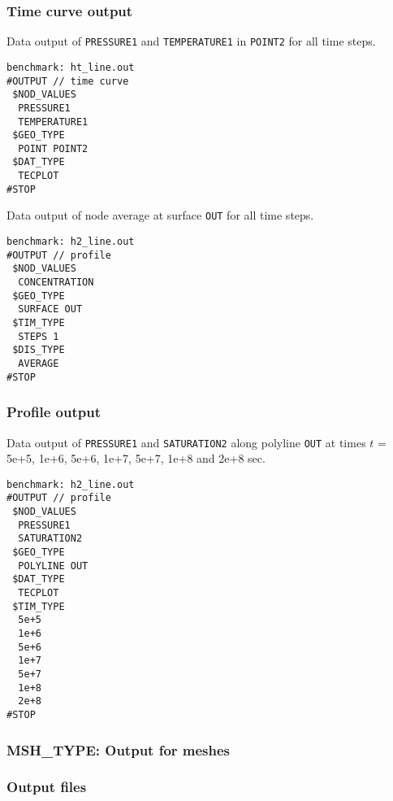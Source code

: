 {%
\subsubsection{Time curve output}

Data output of \texttt{PRESSURE1} and \texttt{TEMPERATURE1} in
\texttt{POINT2} for all time steps.

\begin{verbatim}
benchmark: ht_line.out
#OUTPUT // time curve
 $NOD_VALUES
  PRESSURE1
  TEMPERATURE1
 $GEO_TYPE
  POINT POINT2
 $DAT_TYPE
  TECPLOT
#STOP
\end{verbatim}

Data output of node average at surface \texttt{OUT} for all time steps.

\begin{verbatim}
benchmark: h2_line.out
#OUTPUT // profile
 $NOD_VALUES
  CONCENTRATION
 $GEO_TYPE
  SURFACE OUT
 $TIM_TYPE
  STEPS 1
 $DIS_TYPE
  AVERAGE
#STOP
\end{verbatim}

\subsubsection{Profile output}

Data output of \texttt{PRESSURE1} and \texttt{SATURATION2} along
polyline \texttt{OUT} at times $t$ = 5e+5, 1e+6, 5e+6, 1e+7, 5e+7,
1e+8 and 2e+8 sec.

\begin{verbatim}
benchmark: h2_line.out
#OUTPUT // profile
 $NOD_VALUES
  PRESSURE1
  SATURATION2
 $GEO_TYPE
  POLYLINE OUT
 $DAT_TYPE
  TECPLOT
 $TIM_TYPE
  5e+5
  1e+6
  5e+6
  1e+7
  5e+7
  1e+8
  2e+8
#STOP
\end{verbatim}

\subsubsection{MSH\_TYPE: Output for meshes}

\subsubsection*{Output files}

}
